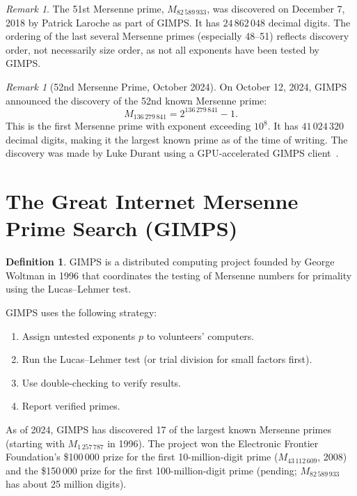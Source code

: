 \documentclass[12pt,a4paper]{amsart}
\theoremstyle{definition}
\newtheorem{definition}[theorem]{Definition}
\theoremstyle{remark}
\newtheorem{remark}[theorem]{Remark}
\begin{document}
\begin{remark}
The 51st Mersenne prime, $M_{82\,589\,933}$, was discovered on December 7, 2018
by Patrick Laroche as part of GIMPS.
It has $24\,862\,048$ decimal digits.
The ordering of the last several Mersenne primes (especially 48--51) reflects
discovery order, not necessarily size order, as not all exponents have been
tested by GIMPS.
\end{remark}

\begin{remark}[52nd Mersenne Prime, October 2024]
\label{rem:52nd}
On October 12, 2024, GIMPS announced the discovery of the 52nd known Mersenne
prime:
\[
    M_{136\,279\,841} = 2^{136\,279\,841} - 1.
\]
This is the first Mersenne prime with exponent exceeding $10^8$.  It has
$41\,024\,320$ decimal digits, making it the largest known prime as of the
time of writing.  The discovery was made by Luke Durant using a GPU-accelerated
GIMPS client~\cite{GIMPS2024b}.
\end{remark}

\section{The Great Internet Mersenne Prime Search (GIMPS)}

\begin{definition}
GIMPS is a distributed computing project founded by George Woltman in 1996
that coordinates the testing of Mersenne numbers for primality using the
Lucas--Lehmer test.
\end{definition}

GIMPS uses the following strategy:
\begin{enumerate}[label=(\arabic*)]
  \item Assign untested exponents $p$ to volunteers' computers.
  \item Run the Lucas--Lehmer test (or trial division for small factors first).
  \item Use double-checking to verify results.
  \item Report verified primes.
\end{enumerate}

As of 2024, GIMPS has discovered 17 of the largest known Mersenne primes
(starting with $M_{1\,257\,787}$ in 1996).
The project won the Electronic Frontier Foundation's \$100\,000 prize for the
first 10-million-digit prime ($M_{43\,112\,609}$, 2008) and the \$150\,000 prize
for the first 100-million-digit prime (pending; $M_{82\,589\,933}$ has about
25 million digits).
\end{document}
